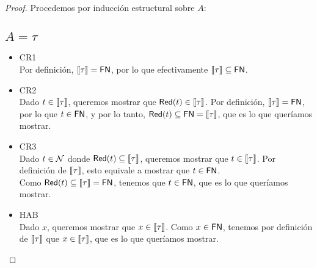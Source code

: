 \begin{proof}
  Procedemos por inducción estructural sobre \( A \):
  \subsection*{\( A = \tau \)}
    \begin{itemize}
      \item CR1
        \\ Por definición, \( \llbracket\tau\rrbracket = \mathsf{FN} \), por lo que efectivamente \( \llbracket\tau\rrbracket \subseteq \mathsf{FN} \).
      \item CR2
        \\ Dado \( t \in \llbracket\tau\rrbracket \), queremos mostrar que \( \mathsf{Red} (t) \in \llbracket\tau\rrbracket \). Por definición, \( \llbracket\tau\rrbracket = \mathsf{FN} \), por lo que \( t \in \mathsf{FN} \), y por lo tanto, \( \mathsf{Red} (t) \subseteq \mathsf{FN} = \llbracket\tau\rrbracket \), que es lo que queríamos mostrar.
      \item CR3
        \\ Dado \( t \in \mathcal{N} \) donde \( \mathsf{Red} (t) \subseteq \llbracket\tau\rrbracket \), queremos mostrar que \( t \in \llbracket\tau\rrbracket \). Por definición de \( \llbracket\tau\rrbracket \), esto equivale a mostrar que \( t \in \mathsf{FN} \).
        \\ Como \( \mathsf{Red} (t) \subseteq \llbracket\tau\rrbracket = \mathsf{FN} \), tenemos que \( t \in \mathsf{FN} \), que es lo que queríamos mostrar.
      \item HAB
        \\ Dado \( x \), queremos mostrar que \( x \in \llbracket\tau\rrbracket \). Como \( x \in \mathsf{FN} \), tenemos por definición de \( \llbracket\tau\rrbracket \) que \( x \in \llbracket\tau\rrbracket \), que es lo que queríamos mostrar.
    \end{itemize}

\end{proof}
